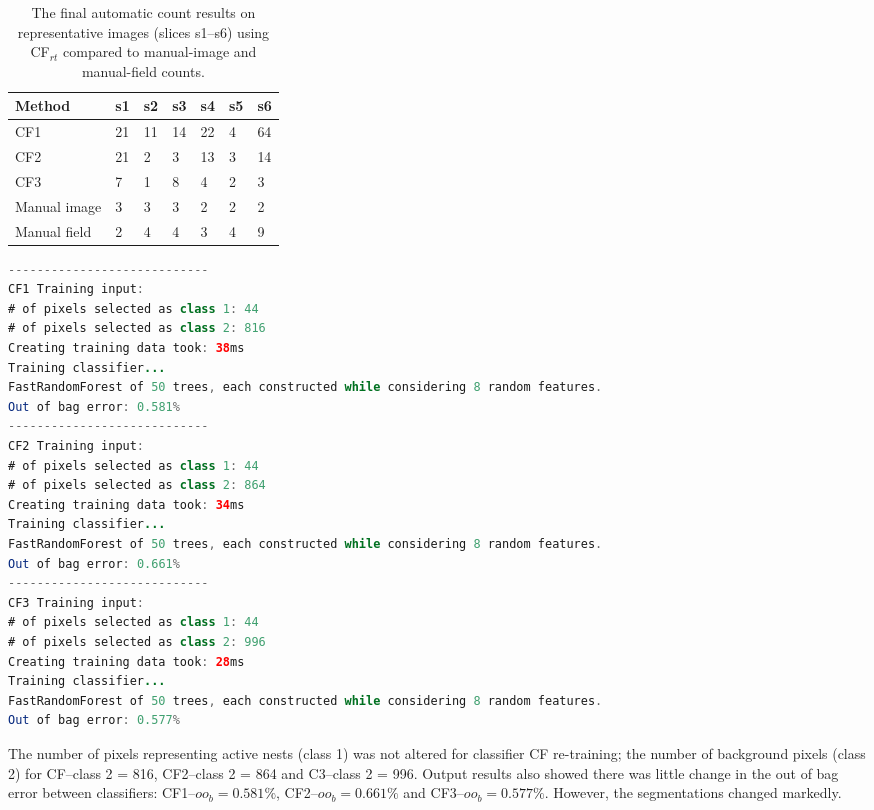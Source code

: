 \begin{table}[!htbp]\myfloatalign \caption[Final count results from test classifier CF.]{The final automatic count results on representative images (slices s1--s6) using CF$ _{rt} $ compared to manual-image and manual-field counts.}\label{tab:Cf-counts} 
\begin{tabular}{lllllll} \toprule
Method &	s1 &	s2 &	s3 &	s4 &	s5 &	s6 \\\toprule
CF1 &	21 &	11 &	14 &	22 &	4 & 64 \\
CF2 &	21 &	2 &	3 &	13 &	3 & 14 \\
CF3 &	7 &	1 &	8 &	4 &	2 &	3  \\
Manual image &	3 &	3 &	3 &	2 &	2 &	2  \\
Manual field &	2 &	4 &	4 &	3 &	4 &	9  \\
\bottomrule
\end{tabular}
\end{table}


\begin{lstlisting}[float, language=java, caption={[Fiji output log from test classifier.]Fiji output log from test classifier (CF) re-training.}, label=cd:cf-retrain-output]
----------------------------
CF1 Training input:
# of pixels selected as class 1: 44
# of pixels selected as class 2: 816
Creating training data took: 38ms
Training classifier...
FastRandomForest of 50 trees, each constructed while considering 8 random features.
Out of bag error: 0.581%
----------------------------
CF2 Training input:
# of pixels selected as class 1: 44
# of pixels selected as class 2: 864
Creating training data took: 34ms
Training classifier...
FastRandomForest of 50 trees, each constructed while considering 8 random features.
Out of bag error: 0.661%
----------------------------
CF3 Training input:
# of pixels selected as class 1: 44
# of pixels selected as class 2: 996
Creating training data took: 28ms 
Training classifier...
FastRandomForest of 50 trees, each constructed while considering 8 random features.
Out of bag error: 0.577%
\end{lstlisting}

The number of pixels representing active nests (class 1) was not altered for classifier CF re-training; the number of background pixels (class 2) for CF--class 2 = 816, CF2--class 2 =  864 and C3--class 2 =  996. Output results also showed there was little change in the out of bag error between classifiers: CF1--$ oo_{b} = 0.581\%$, CF2--$ oo_{b} = 0.661\%$ and CF3--$ oo_{b} =0.577\%$. However, the segmentations changed markedly.

